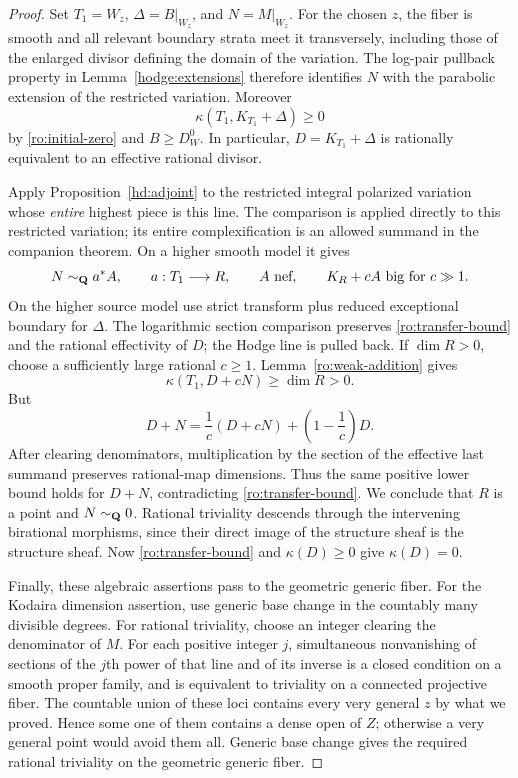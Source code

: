 \begin{proof}
Set $T_1=W_z$, $\Delta=B|_{W_z}$, and $N=M|_{W_z}$. For the chosen
$z$, the fiber is smooth and all relevant boundary strata meet it
transversely, including those of the enlarged divisor defining the
domain of the variation. The log-pair pullback property in
Lemma~\ref{hodge:extensions} therefore identifies
$N$ with the parabolic extension of the restricted variation.
Moreover
\[
 \kappa(T_1,K_{T_1}+\Delta)\ge0
\]
by \eqref{ro:initial-zero} and $B\ge D_W^0$.  In particular,
$D=K_{T_1}+\Delta$ is rationally equivalent to an effective rational
divisor.

Apply Proposition~\ref{hd:adjoint} to the restricted integral polarized
variation whose \emph{entire} highest piece is this line. The comparison is applied directly to this restricted variation;
its entire complexification is an allowed summand in the companion theorem. On a higher smooth model it gives
\[
 N\sim_{\mathbf Q}a^*A,
 \qquad a:T_1\longrightarrow R,
 \qquad A\text{ nef},
 \qquad K_R+cA\text{ big for }c\gg1.
\]
On the higher source model use strict transform plus reduced
exceptional boundary for $\Delta$.  The logarithmic section comparison
preserves \eqref{ro:transfer-bound} and the rational effectivity of
$D$; the Hodge line is pulled back.  If $\dim R>0$, choose a sufficiently
large rational $c\ge1$.  Lemma~\ref{ro:weak-addition} gives
\[
 \kappa(T_1,D+cN)\ge\dim R>0.
\]
But
\begin{equation}
 D+N=\frac1c(D+cN)+\left(1-\frac1c\right)D.
 \label{ro:interpolation}
\end{equation}
After clearing denominators, multiplication by the section of the
effective last summand preserves rational-map dimensions.  Thus the
same positive lower bound holds for $D+N$, contradicting
\eqref{ro:transfer-bound}.  We conclude that $R$ is a point and
$N\sim_{\mathbf Q}0$.  Rational triviality descends through the intervening
birational morphisms, since their direct image of the structure sheaf
is the structure sheaf.  Now \eqref{ro:transfer-bound} and
$\kappa(D)\ge0$ give $\kappa(D)=0$.

Finally, these algebraic assertions pass to the geometric generic
fiber.  For the Kodaira dimension assertion, use generic base change
in the countably many divisible degrees.  For rational triviality,
choose an integer clearing the denominator of $M$.  For each positive
integer $j$, simultaneous nonvanishing of sections of the $j$th power
of that line and of its inverse is a closed condition on a smooth
proper family, and is equivalent to triviality on a connected
projective fiber.  The countable union of these loci contains every
very general $z$ by what we proved.  Hence some one of them contains a
dense open of $Z$; otherwise a very general point would avoid them
all.  Generic base change gives the required rational triviality on
the geometric generic fiber.
\end{proof}

